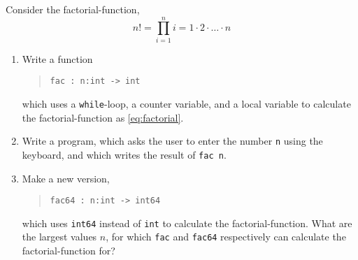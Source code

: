 Consider the factorial-function,
\begin{equation}
  n! = \prod_{i=1}^n i = 1\cdot 2\cdot \ldots \cdot n
  \label{eq:factorial}
\end{equation}
\begin{enumerate}
\item \label{loops.faq.while} Write a function
  \begin{quote}
    \mbox{\lstinline!fac : n:int -> int!}
  \end{quote}
  which uses a \lstinline!while!-loop, a counter variable, and a local
  variable to calculate the factorial-function as \eqref{eq:factorial}.
  \item Write a program, which asks the user to enter the number
    \lstinline!n! using the keyboard, and which writes the result of \lstinline!fac n!.
  \item Make a new version, 
    \begin{quote}
      \mbox{\lstinline!fac64 : n:int -> int64!}
    \end{quote}
    which uses \lstinline{int64} instead of \lstinline{int} to
    calculate the factorial-function. What are the largest values $n$,
    for which \lstinline{fac} and \lstinline{fac64} respectively can
    calculate the factorial-function for?
  \end{enumerate}
